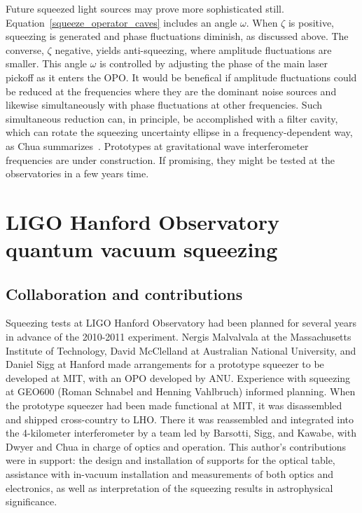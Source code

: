 Future squeezed light sources may prove more sophisticated still.
Equation~\ref{squeeze_operator_caves} includes an angle $\omega$. When $\zeta$ is positive, squeezing is generated and phase fluctuations diminish, as discussed above. 
The converse, $\zeta$ negative, yields anti-squeezing, where amplitude fluctuations are smaller. 
This angle $\omega$ is controlled by adjusting the phase of the main laser pickoff as it enters the OPO.
It would be benefical if amplitude fluctuations could be reduced at the frequencies where they are the dominant noise sources and likewise simultaneously with phase fluctuations at other frequencies. 
Such simultaneous reduction can, in principle, be accomplished with a filter cavity, which can rotate the squeezing uncertainty ellipse in a frequency-dependent way, as Chua summarizes~\cite{ChuaThesis}.
Prototypes at gravitational wave interferometer frequencies are under construction.
If promising, they might be tested at the observatories in a few years time.

    \section{LIGO Hanford Observatory quantum vacuum squeezing}
    \label{LHO_squeeze}


        \subsection{Collaboration and contributions}
        \label{contributions}

        Squeezing tests at LIGO Hanford Observatory had been planned for several years in advance of the 2010-2011 experiment.
Nergis Malvalvala at the Massachusetts Institute of Technology, David McClelland at Australian National University, and Daniel Sigg at Hanford made arrangements for a prototype squeezer to be developed at MIT, with an OPO developed by ANU.
Experience with squeezing at GEO600 (Roman Schnabel and Henning Vahlbruch) informed planning. 
When the prototype squeezer had been made functional at MIT, it was disassembled and shipped cross-country to LHO.
There it was reassembled and integrated into the 4-kilometer interferometer by a team led by Barsotti, Sigg, and Kawabe, with Dwyer and Chua in charge of optics and operation.
This author's contributions were in support: the design and installation of supports for the optical table, assistance with in-vacuum installation and measurements of both optics and electronics, as well as interpretation of the squeezing results in astrophysical significance.

